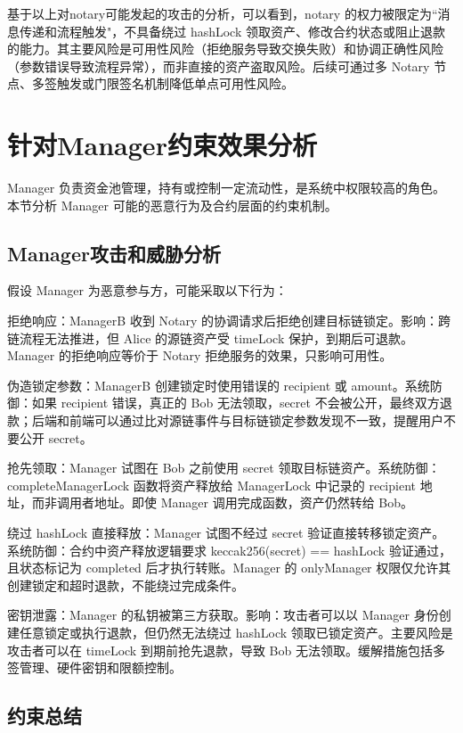 基于以上对notary可能发起的攻击的分析，可以看到，notary 的权力被限定为``消息传递和流程触发"，不具备绕过 hashLock 领取资产、修改合约状态或阻止退款的能力。其主要风险是可用性风险（拒绝服务导致交换失败）和协调正确性风险（参数错误导致流程异常），而非直接的资产盗取风险。后续可通过多 Notary 节点、多签触发或门限签名机制降低单点可用性风险。


\section{针对Manager约束效果分析}


Manager 负责资金池管理，持有或控制一定流动性，是系统中权限较高的角色。本节分析 Manager 可能的恶意行为及合约层面的约束机制。


\subsection{Manager攻击和威胁分析}


假设 Manager 为恶意参与方，可能采取以下行为：


拒绝响应：ManagerB 收到 Notary 的协调请求后拒绝创建目标链锁定。影响：跨链流程无法推进，但 Alice 的源链资产受 timeLock 保护，到期后可退款。Manager 的拒绝响应等价于 Notary 拒绝服务的效果，只影响可用性。


伪造锁定参数：ManagerB 创建锁定时使用错误的 recipient 或 amount。系统防御：如果 recipient 错误，真正的 Bob 无法领取，secret 不会被公开，最终双方退款；后端和前端可以通过比对源链事件与目标链锁定参数发现不一致，提醒用户不要公开 secret。


抢先领取：Manager 试图在 Bob 之前使用 secret 领取目标链资产。系统防御：completeManagerLock 函数将资产释放给 ManagerLock 中记录的 recipient 地址，而非调用者地址。即使 Manager 调用完成函数，资产仍然转给 Bob。


绕过 hashLock 直接释放：Manager 试图不经过 secret 验证直接转移锁定资产。系统防御：合约中资产释放逻辑要求 keccak256(secret) == hashLock 验证通过，且状态标记为 completed 后才执行转账。Manager 的 onlyManager 权限仅允许其创建锁定和超时退款，不能绕过完成条件。


密钥泄露：Manager 的私钥被第三方获取。影响：攻击者可以以 Manager 身份创建任意锁定或执行退款，但仍然无法绕过 hashLock 领取已锁定资产。主要风险是攻击者可以在 timeLock 到期前抢先退款，导致 Bob 无法领取。缓解措施包括多签管理、硬件密钥和限额控制。


\subsection{约束总结}


